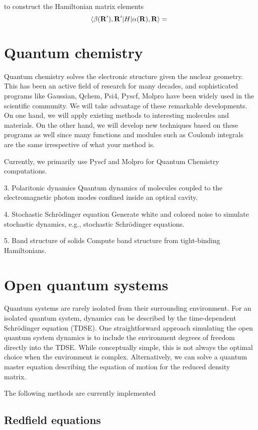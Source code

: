 \documentclass[a4paper,12pt]{book}
\newcommand{\be}{\begin{equation}}
\newcommand{\ee}{\end{equation}}
\renewcommand{\bf}{\mathbf}
\renewcommand{\bf}{\mathbf}
\begin{document}
to construct the Hamiltonian matrix elements 
\be \braket{\beta(\bf R'), \bf R' | H | \alpha(\bf R), \bf R} = 
\ee 

\chapter{Quantum chemistry} 
Quantum chemistry solves the electronic structure given the nuclear geometry. This has been an active field of research for many decades, and sophisticated programs like Gaussian, Qchem, Psi4, Pyscf, Molpro have been widely used in the scientific community. We will take advantage of these remarkable developments. On one hand, we will apply existing methods to interesting molecules and materials. On the other hand, we will develop new techniques based on these programs as well since many functions and modules such as Coulomb integrals are the same irrespective of what your method is.

Currently, we primarily use Pyscf and Molpro for Quantum Chemistry computations.

3. Polaritonic dynamics
Quantum dynamics of molecules coupled to the electromagnetic photon modes confined inside an optical cavity.

4. Stochastic Schrödinger equation
Generate white and colored noise to simulate stochastic dynamics, e.g., stochastic Schrödinger equations.

5. Band structure of solids
Compute band structure from tight-binding Hamiltonians.

\chapter{Open quantum systems} 
Quantum systems are rarely isolated from their surrounding environment. For an isolated quantum system, dynamics can be described by the time-dependent Schrödinger equation (TDSE). One straightforward approach simulating the open quantum system dynamics is to include the environment degrees of freedom directly into the TDSE. While conceptually simple, this is not always the optimal choice when the environment is complex. Alternatively, we can solve a quantum master equation describing the equation of motion for the reduced density matrix.

The following methods are currently implemented

\section{Redfield equations} 
\end{document}
